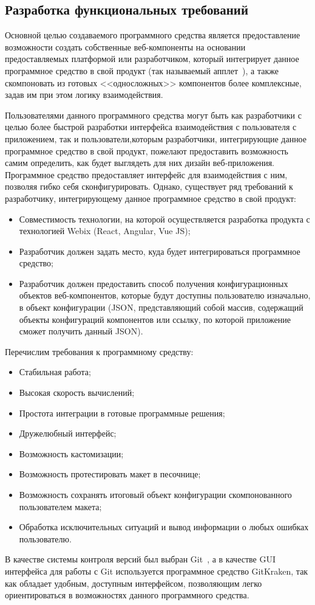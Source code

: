 \subsection{Разработка функциональных требований}
\label{sec:modeling:specification}

Основной целью создаваемого программного средства является предоставление возможности создать собственные веб-компоненты на основании предоставляемых платформой или разработчиком, который интегрирует данное программное средство в свой продукт (так называемый апплет~\cite{wiki_applet}), а также скомпоновать из готовых <<односложных>> компонентов более комплексные, задав им при этом логику взаимодействия.
 
Пользователями данного программного средства могут быть как разработчики с целью более быстрой разработки интерфейса взаимодействия с пользователя с приложением, так и пользователи,которым разработчики, интегрирующие данное программное средство в свой продукт, пожелают предоставить возможность самим определить, как будет выглядеть для них дизайн веб-приложения.
Программное средство предоставляет интерфейс для взаимодействия с ним, позволяя гибко себя сконфигурировать. Однако, существует ряд требований к разработчику, интегрирующему данное программное средство в свой продукт:

\begin{itemize}
    \item Совместимость технологии, на которой осуществляется разработка продукта с технологией Webix (React, Angular, Vue JS);
    \item Разработчик должен задать место, куда будет интегрироваться программное средство;
    \item Разработчик должен предоставить способ получения конфигурационных объектов веб-компонентов, которые будут доступны пользователю изначально, в объект конфигурации (JSON, представляющий собой массив, содержащий объекты конфигураций компонентов или ссылку, по которой приложение сможет получить данный JSON).
\end{itemize}

Перечислим требования к программному средству:

\begin{itemize}
    \item Стабильная работа;
    \item Высокая скорость вычислений;
    \item Простота интеграции в готовые программные решения;
    \item Дружелюбный интерфейс;
    \item Возможность кастомизации;
    \item Возможность протестировать макет в песочнице;
    \item Возможность сохранять итоговый объект конфигурации скомпонованного пользователем макета;
    \item Обработка исключительных ситуаций и вывод информации о любых ошибках пользователю.
\end{itemize}

В качестве системы контроля версий был выбран Git~\cite{git}, а в качестве GUI интерфейса для работы с Git используется программное средство GitKraken, так как обладает удобным, доступным интерфейсом, позволяющим легко ориентироваться в возможностях данного программного средства.
